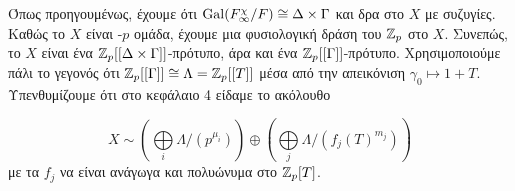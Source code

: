 \begin{figure}[H]
    \centering
\end{figure}

\noindent Όπως προηγουμένως, έχουμε ότι $\operatorname{Gal}(F^\chi_\infty/F) \cong \Delta \times \Gamma$ και δρα στο $X$ με συζυγίες. Καθώς το $X$ 
είναι -$p$ ομάδα, έχουμε μια φυσιολογική δράση του $\mathbb{Z}_p$ στο $X$. Συνεπώς, το $X$ είναι ένα 
$\mathbb{Z}_p [[\Delta \times \Gamma]]$-πρότυπο, άρα και ένα $\mathbb{Z}_p[[\Gamma]]$-πρότυπο. Χρησιμοποιούμε πάλι το γεγονός ότι 
$\mathbb{Z}_p[[\Gamma]] \cong \Lambda = \mathbb{Z}_p[[T]]$ μέσα από την απεικόνιση $\gamma_0 \longmapsto 1+T$. Υπενθυμίζουμε ότι στο κεφάλαιο 4 είδαμε το ακόλουθο

\begin{equation}\label{eq5.1}
    X \sim \left(\bigoplus\limits_i \Lambda/(p^{\mu_i})\right) \oplus \left(\bigoplus\limits_j \Lambda/(f_j(T)^{m_j})\right)
\end{equation} με τα $f_j$ να είναι ανάγωγα και  πολυώνυμα στο $\mathbb{Z}_p[T]$.

